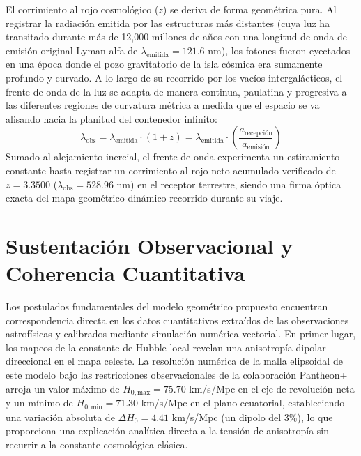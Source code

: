 \documentclass[11pt,a4paper]{article}
\begin{document}
El corrimiento al rojo cosmológico ($z$) se deriva de forma geométrica pura. Al registrar la radiación emitida por las estructuras más distantes (cuya luz ha transitado durante más de 12,000 millones de años con una longitud de onda de emisión original Lyman-alfa de $\lambda_{\text{emitida}} = 121.6$ nm), los fotones fueron eyectados en una época donde el pozo gravitatorio de la isla cósmica era sumamente profundo y curvado. A lo largo de su recorrido por los vacíos intergalácticos, el frente de onda de la luz se adapta de manera continua, paulatina y progresiva a las diferentes regiones de curvatura métrica a medida que el espacio se va alisando hacia la planitud del contenedor infinito:
\begin{equation}
\lambda_{\text{obs}} = \lambda_{\text{emitida}} \cdot (1 + z) = \lambda_{\text{emitida}} \cdot \left( \frac{a_{\text{recepción}}}{a_{\text{emisión}}} \right)
\end{equation}
Sumado al alejamiento inercial, el frente de onda experimenta un estiramiento constante hasta registrar un corrimiento al rojo neto acumulado verificado de $z = 3.3500$ ($\lambda_{\text{obs}} = 528.96$ nm) en el receptor terrestre, siendo una firma óptica exacta del mapa geométrico dinámico recorrido durante su viaje.

\section{Sustentación Observacional y Coherencia Cuantitativa}
Los postulados fundamentales del modelo geométrico propuesto encuentran correspondencia directa en los datos cuantitativos extraídos de las observaciones astrofísicas y calibrados mediante simulación numérica vectorial. En primer lugar, los mapeos de la constante de Hubble local revelan una anisotropía dipolar direccional en el mapa celeste. La resolución numérica de la malla elipsoidal de este modelo bajo las restricciones observacionales de la colaboración Pantheon+ arroja un valor máximo de $H_{0,\text{max}} = 75.70$ km/s/Mpc en el eje de revolución neta y un mínimo de $H_{0,\text{min}} = 71.30$ km/s/Mpc en el plano ecuatorial, estableciendo una variación absoluta de $\Delta H_0 = 4.41$ km/s/Mpc (un dipolo del 3\%), lo que proporciona una explicación analítica directa a la tensión de anisotropía sin recurrir a la constante cosmológica clásica.
\end{document}
